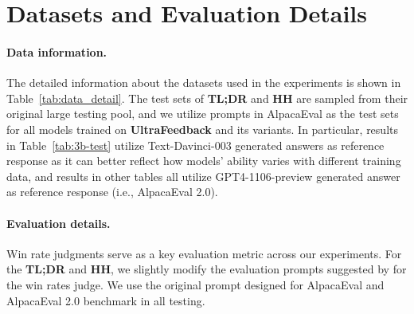 
\section{Datasets and Evaluation Details}
\label{app:data}

\paragraph{Data information.} The detailed information about the datasets used in the experiments is shown in Table~\ref{tab:data_detail}. The test sets of \textbf{TL;DR} and \textbf{HH} are sampled from their original large testing pool, and we utilize prompts in AlpacaEval as the test sets for all models trained on \textbf{UltraFeedback} and its variants. In particular, results in Table~\ref{tab:3b-test} utilize Text-Davinci-003 generated answers as reference response as it can better reflect how models' ability varies with different training data, and results in other tables all utilize GPT4-1106-preview generated answer as reference response (i.e., AlpacaEval 2.0).

\begin{table}[h]
    \centering
    \setlength{\abovecaptionskip}{0.1cm}
    \setlength{\belowcaptionskip}{0cm}
    \vspace{-15pt}
    \setlength{\tabcolsep}{40pt} 
    \caption{Statistical information about the training and evaluation datasets used in the experiments.}
    \label{tab:data_detail}
    \vspace{-15pt}
\end{table}

\paragraph{Evaluation details.} Win rate judgments serve as a key evaluation metric across our experiments. For the \textbf{TL;DR} and \textbf{HH}, we slightly modify the evaluation prompts suggested by \citet{rafailov2024direct} for the win rates judge. We use the original prompt designed for AlpacaEval and AlpacaEval 2.0 benchmark in all testing.

